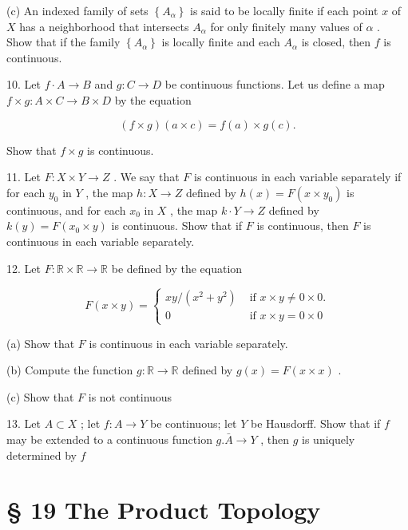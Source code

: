 (c) An indexed family of sets \(\left\{  {A}_{\alpha }\right\}\) is said to be locally finite if each point \(x\) of \(X\) has a neighborhood that intersects \({A}_{\alpha }\) for only finitely many values of \(\alpha\) . Show that if the family \(\left\{  {A}_{\alpha }\right\}\) is locally finite and each \({A}_{\alpha }\) is closed, then \(f\) is continuous.

10. Let \(f \cdot  A \rightarrow  B\) and \(g : C \rightarrow  D\) be continuous functions. Let us define a map \(f \times  g : A \times  C \rightarrow  B \times  D\) by the equation

\[
\left( {f \times  g}\right) \left( {a \times  c}\right)  = f\left( a\right)  \times  g\left( c\right) .
\]

Show that \(f \times  g\) is continuous.

11. Let \(F : X \times  Y \rightarrow  Z\) . We say that \(F\) is continuous in each variable separately if for each \({y}_{0}\) in \(Y\) , the map \(h : X \rightarrow  Z\) defined by \(h\left( x\right)  = F\left( {x \times  {y}_{0}}\right)\) is continuous, and for each \({x}_{0}\) in \(X\) , the map \(k \cdot  Y \rightarrow  Z\) defined by \(k\left( y\right)  = F\left( {{x}_{0} \times  y}\right)\) is continuous. Show that if \(F\) is continuous, then \(F\) is continuous in each variable separately.

12. Let \(F : \mathbb{R} \times  \mathbb{R} \rightarrow  \mathbb{R}\) be defined by the equation

\[
F\left( {x \times  y}\right)  = \left\{  \begin{array}{ll} {xy}/\left( {{x}^{2} + {y}^{2}}\right) & \text{ if }x \times  y \neq  0 \times  0. \\  0 & \text{ if }x \times  y = 0 \times  0 \end{array}\right.
\]

(a) Show that \(F\) is continuous in each variable separately.

(b) Compute the function \(g : \mathbb{R} \rightarrow  \mathbb{R}\) defined by \(g\left( x\right)  = F\left( {x \times  x}\right)\) .

(c) Show that \(F\) is not continuous

13. Let \(A \subset  X\) ; let \(f : A \rightarrow  Y\) be continuous; let \(Y\) be Hausdorff. Show that if \(f\) may be extended to a continuous function \(g.\bar{A} \rightarrow  Y\) , then \(g\) is uniquely determined by \(f\)

\section*{§ 19 The Product Topology}

